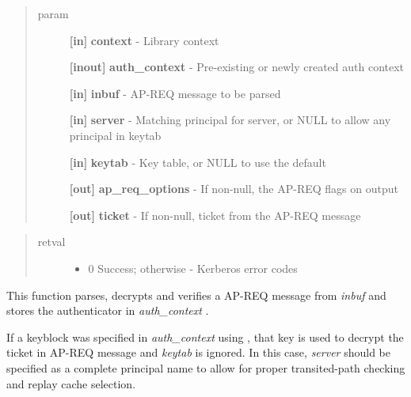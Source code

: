 \documentclass[letterpaper,10pt,english]{sphinxmanual}
\begin{document}
\begin{quote}\begin{description}
\item[{param}] \leavevmode
\textbf{{[}in{]}} \textbf{context} - Library context

\textbf{{[}inout{]}} \textbf{auth\_context} - Pre-existing or newly created auth context

\textbf{{[}in{]}} \textbf{inbuf} - AP-REQ message to be parsed

\textbf{{[}in{]}} \textbf{server} - Matching principal for server, or NULL to allow any principal in keytab

\textbf{{[}in{]}} \textbf{keytab} - Key table, or NULL to use the default

\textbf{{[}out{]}} \textbf{ap\_req\_options} - If non-null, the AP-REQ flags on output

\textbf{{[}out{]}} \textbf{ticket} - If non-null, ticket from the AP-REQ message

\end{description}\end{quote}
\begin{quote}\begin{description}
\item[{retval}] \leavevmode\begin{itemize}
\item {} 
0   Success; otherwise - Kerberos error codes

\end{itemize}

\end{description}\end{quote}

This function parses, decrypts and verifies a AP-REQ message from \emph{inbuf} and stores the authenticator in \emph{auth\_context} .

If a keyblock was specified in \emph{auth\_context} using {\hyperref[appdev/refs/api/krb5_auth_con_setuseruserkey:c.krb5_auth_con_setuseruserkey]{}} , that key is used to decrypt the ticket in AP-REQ message and \emph{keytab} is ignored. In this case, \emph{server} should be specified as a complete principal name to allow for proper transited-path checking and replay cache selection.
\end{document}
